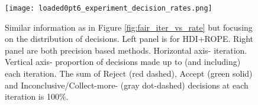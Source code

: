 \begin{figure}[h!]
  \centering
  \texttt{[image: loaded0pt6\_experiment\_decision\_rates.png]}
  \caption{Similar information as in Figure \ref{fig:fair_iter_vs_rate} but focusing on
  the distribution of decisions. Left panel is for HDI+ROPE. Right panel are both
  precision based methods. Horizontal axis- iteration. Vertical axis- proportion of
  decisions made up to (and including) each iteration. The sum of Reject (red dashed),
  Accept (green solid) and Inconclusive/Collect-more- (gray dot-dashed) decisions at
  each iteration is 100\%.
  }
  \label{fig:loaded0pt6_decisions}
\end{figure}